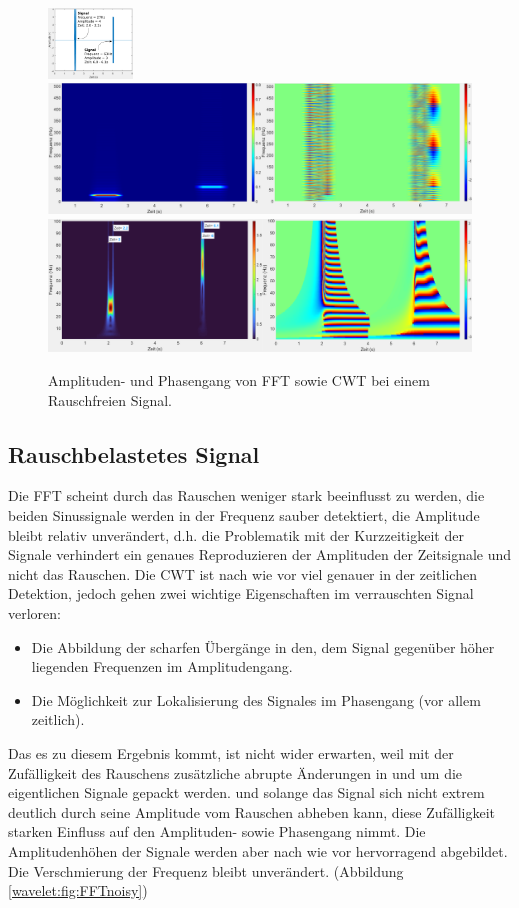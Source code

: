 \begin{figure}
	\centering
	\includegraphics[width=0.2\textwidth]{papers/wavelets/images/18-1_CWTvsFFTSignal.png}
	\includegraphics[width=\textwidth]{papers/wavelets/images/18-2_FFTnoiseFree.png}
	\includegraphics[width=\textwidth]{papers/wavelets/images/18-3_CWTnoiseFree.png}
	\caption{Amplituden- und Phasengang von FFT sowie CWT bei einem Rauschfreien Signal.}
	\label{wavelet:fig:FFTnoiseFree}
\end{figure}

	
\subsection{Rauschbelastetes Signal
	\label{wavelets:subsection:CWTvsFFTRauschbelastet}}
Die FFT scheint durch das Rauschen weniger stark beeinflusst zu werden, die beiden Sinussignale werden in der Frequenz sauber detektiert, die Amplitude bleibt relativ unverändert, d.h. die Problematik mit der Kurzzeitigkeit der Signale verhindert ein genaues Reproduzieren der Amplituden der Zeitsignale und nicht das Rauschen.
Die CWT ist nach wie vor viel genauer in der zeitlichen Detektion, jedoch gehen zwei wichtige Eigenschaften im verrauschten Signal verloren:
\begin{itemize}
	\item Die Abbildung der scharfen Übergänge in den, dem Signal gegenüber höher liegenden Frequenzen im Amplitudengang.
	\item Die Möglichkeit zur Lokalisierung des Signales im Phasengang (vor allem zeitlich).
\end{itemize}
Das es zu diesem Ergebnis kommt, ist nicht wider erwarten, weil mit der Zufälligkeit des Rauschens zusätzliche abrupte Änderungen in und um die eigentlichen Signale gepackt werden. und solange das Signal sich nicht extrem deutlich durch seine Amplitude vom Rauschen abheben kann, diese Zufälligkeit starken Einfluss auf den Amplituden- sowie Phasengang nimmt.
Die Amplitudenhöhen der Signale werden aber nach wie vor hervorragend abgebildet. Die Verschmierung der Frequenz bleibt unverändert.
(Abbildung \ref{wavelet:fig:FFTnoisy})
	
